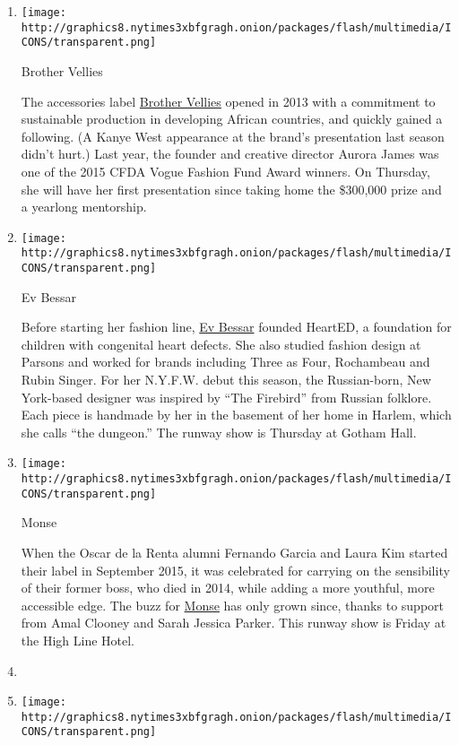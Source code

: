\begin{enumerate}
\def\labelenumi{\arabic{enumi}.}
\item
  \texttt{[image: http://graphics8.nytimes3xbfgragh.onion/packages/flash/multimedia/ICONS/transparent.png]}

  Brother Vellies

  The accessories label
  \href{http://www.brothervellies.com/site/}{Brother Vellies} opened in
  2013 with a commitment to sustainable production in developing African
  countries, and quickly gained a following. (A Kanye West appearance at
  the brand's presentation last season didn't hurt.) Last year, the
  founder and creative director Aurora James was one of the 2015 CFDA
  Vogue Fashion Fund Award winners. On Thursday, she will have her first
  presentation since taking home the \$300,000 prize and a yearlong
  mentorship.
\item
  \texttt{[image: http://graphics8.nytimes3xbfgragh.onion/packages/flash/multimedia/ICONS/transparent.png]}

  Ev Bessar

  Before starting her fashion line, \href{http://www.evbessar.com}{Ev
  Bessar} founded HeartED, a foundation for children with congenital
  heart defects. She also studied fashion design at Parsons and worked
  for brands including Three as Four, Rochambeau and Rubin Singer. For
  her N.Y.F.W. debut this season, the Russian-born, New York-based
  designer was inspired by ``The Firebird'' from Russian folklore. Each
  piece is handmade by her in the basement of her home in Harlem, which
  she calls ``the dungeon.'' The runway show is Thursday at Gotham Hall.
\item
  \texttt{[image: http://graphics8.nytimes3xbfgragh.onion/packages/flash/multimedia/ICONS/transparent.png]}

  Monse

  When the Oscar de la Renta alumni Fernando Garcia and Laura Kim
  started their label in September 2015, it was celebrated for carrying
  on the sensibility of their former boss, who died in 2014, while
  adding a more youthful, more accessible edge. The buzz for
  \href{http://www.monse.com}{Monse} has only grown since, thanks to
  support from Amal Clooney and Sarah Jessica Parker. This runway show
  is Friday at the High Line Hotel. 
\item
\item
  \texttt{[image: http://graphics8.nytimes3xbfgragh.onion/packages/flash/multimedia/ICONS/transparent.png]}


\end{enumerate}

